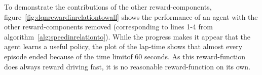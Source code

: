 To demonstrate the contributions of the other reward-components, figure~\ref{fig:dqnrewardinrelationtowall} shows the performance of an agent with the other reward-components removed (corresponding to lines 1-4 from algorithm~\ref{alg:speedinrelationto}). While the progress makes it appear that the agent learns a useful policy, the plot of the lap-time shows that almost every episode ended because of the time limitof 60 seconds. As this reward-function does always reward driving fast, it is no reasonable reward-function on its own.
